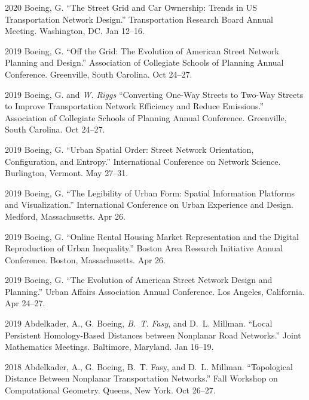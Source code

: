 \documentclass[12pt,letterpaper]{report}
\begin{document}
\begin{tablist}
        \item[2020] \tab Boeing, G. \enquote{The Street Grid and Car Ownership: Trends in US Transportation Network Design.} Transportation Research Board Annual Meeting. Washington, DC. Jan 12--16.

        \item[2019] \tab Boeing, G. \enquote{Off the Grid: The Evolution of American Street Network Planning and Design.} Association of Collegiate Schools of Planning Annual Conference. Greenville, South Carolina. Oct 24--27.

        \item[2019] \tab Boeing, G. and \textit{W. Riggs} \enquote{Converting One-Way Streets to Two-Way Streets to Improve Transportation Network Efficiency and Reduce Emissions.} Association of Collegiate Schools of Planning Annual Conference. Greenville, South Carolina. Oct 24--27.

        \item[2019] \tab Boeing, G. \enquote{Urban Spatial Order: Street Network Orientation, Configuration, and Entropy.} International Conference on Network Science. Burlington, Vermont. May 27--31.

        \item[2019] \tab Boeing, G. \enquote{The Legibility of Urban Form: Spatial Information Platforms and Visualization.} International Conference on Urban Experience and Design. Medford, Massachusetts. Apr 26.

        \item[2019] \tab Boeing, G. \enquote{Online Rental Housing Market Representation and the Digital Reproduction of Urban Inequality.} Boston Area Research Initiative Annual Conference. Boston, Massachusetts. Apr 26.

        \item[2019] \tab Boeing, G. \enquote{The Evolution of American Street Network Design and Planning.} Urban Affairs Association Annual Conference. Los Angeles, California. Apr 24--27.

        \item[2019] \tab Abdelkader, A., G. Boeing, \textit{B.~T. Fasy}, and D.~L. Millman. \enquote{Local Persistent Homology-Based Distances between Nonplanar Road Networks.} Joint Mathematics Meetings. Baltimore, Maryland. Jan 16--19.

        \item[2018] \tab Abdelkader, A., G. Boeing, B.~T. Fasy, and D.~L. Millman. \enquote{Topological Distance Between Nonplanar Transportation Networks.} Fall Workshop on Computational Geometry. Queens, New York. Oct 26--27.


\end{tablist}
\end{document}
